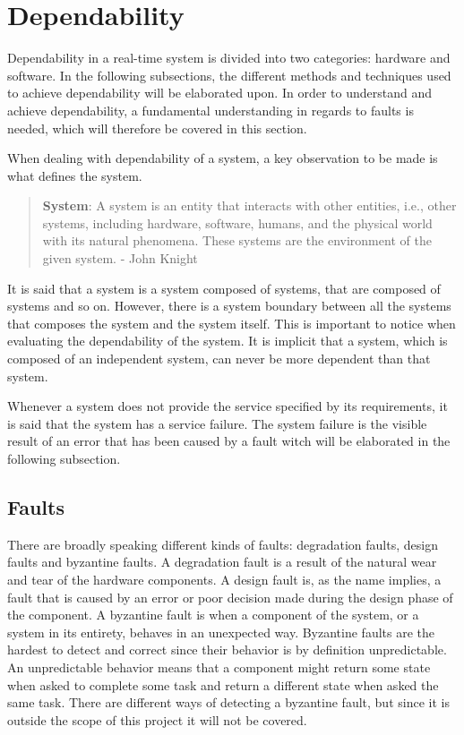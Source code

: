 \section{Dependability}\label{sec:dependability}
Dependability in a real-time system is divided into two categories: hardware and software. 
In the following subsections, the different methods and techniques used to achieve dependability will be elaborated upon.
In order to understand and achieve dependability, a fundamental understanding in regards to faults is needed, which will therefore be covered in this section.

When dealing with dependability of a system, a key observation to be made is what defines the system. 
\begin{quote}
\textbf{System}: A system is an entity that interacts with other entities, i.e., other systems, including hardware, software, humans, and the physical world with its natural phenomena.
These systems are the environment of the given system. 
- John Knight \cite{FundementalsOfDependableComputingForSoftwareEngineers}
\end{quote}
It is said that a system is a system composed of systems, that are composed of systems and so on. 
However, there is a system boundary between all the systems that composes the system and the system itself. 
This is important to notice when evaluating the dependability of the system. 
It is implicit that a system, which is composed of an independent system, can never be more dependent than that system. 

Whenever a system does not provide the service specified by its requirements, it is said that the system has a service failure. 
The system failure is the visible result of an error that has been caused by a fault witch will be elaborated in the following subsection.

\subsection{Faults}
There are broadly speaking different kinds of faults: degradation faults, design faults and byzantine faults. 
A degradation fault is a result of the natural wear and tear of the hardware components.
A design fault is, as the name implies, a fault that is caused by an error or poor decision made during the design phase of the component. 
A byzantine fault is when a component of the system, or a system in its entirety, behaves in an unexpected way. 
Byzantine faults are the hardest to detect and correct since their behavior is by definition unpredictable. 
An unpredictable behavior means that a component might return some state when asked to complete some task and return a different state when asked the same task. 
There are different ways of detecting a byzantine fault, but since it is outside the scope of this project it will not be covered. 

